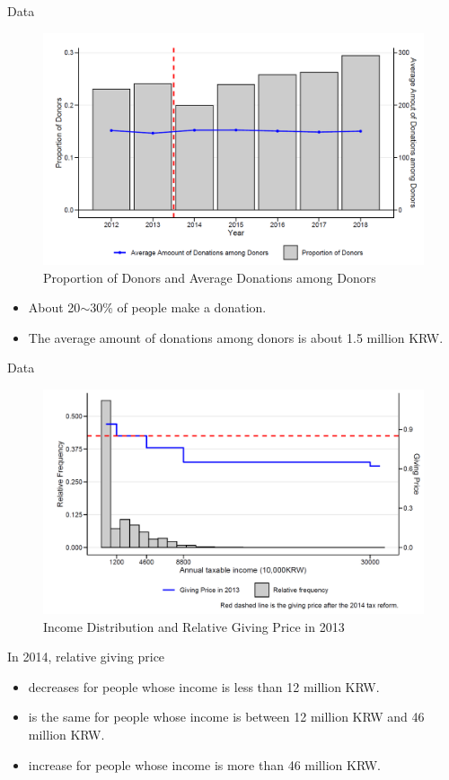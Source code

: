 \documentclass[dvipdfmx,10pt]{beamer}
\begin{document}
\begin{frame}{Data}
	\begin{figure}
		\centering
		\includegraphics[width=0.8\linewidth]{Fig_Average_donation}
		\caption{Proportion of Donors and Average Donations among Donors}
		\label{fig:1}
	\end{figure}
\small
	\begin{itemize}
		\item About 20$\sim$30\% of people make a donation.
		\item The average amount of donations among donors is about 1.5 million KRW.
	\end{itemize}
\end{frame}

\begin{frame}{Data}
	\begin{figure}
		\centering
		\includegraphics[width=0.7\linewidth]{Fig_Income_distribution}
		\caption{Income Distribution and Relative Giving Price in 2013}
		\label{fig:2}
	\end{figure}
\small
	In 2014, relative giving price
	\begin{itemize}
		\item decreases for people whose income is less than 12 million KRW.
		\item is the same for people whose income is between 12 million KRW and 46 million KRW.
		\item increase for people whose income is more than 46 million KRW.
	\end{itemize}
\end{frame}
\end{document}
